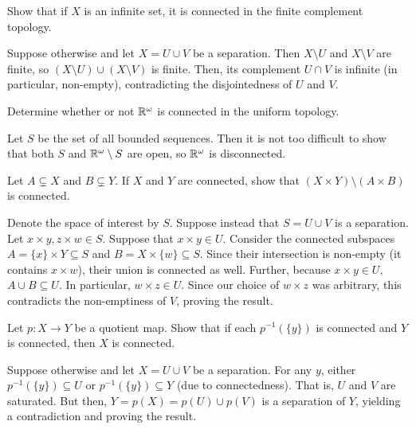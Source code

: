 	\begin{exercise}
		Show that if $X$ is an infinite set, it is connected in the finite complement topology.
	\end{exercise}
	\begin{solution*}
		Suppose otherwise and let $X=U\cup V$ be a separation. Then $X\setminus U$ and $X\setminus V$ are finite, so $(X\setminus U)\cup (X\setminus V)$ is finite. Then, its complement $U\cap V$ is infinite (in particular, non-empty), contradicting the disjointedness of $U$ and $V$. 
	\end{solution*}

	\setcounter{exercise}{7}
	\begin{exercise}
		Determine whether or not $\mathbb{R}^\omega$ is connected in the uniform topology.
	\end{exercise}
	\begin{solution*}
		Let $S$ be the set of all bounded sequences. Then it is not too difficult to show that both $S$ and $\mathbb{R}^\omega\setminus S$ are open, so $\mathbb{R}^\omega$ is disconnected.
	\end{solution*}


	\begin{exercise}
		Let $A\subsetneq X$ and $B\subsetneq Y$. If $X$ and $Y$ are connected, show that $(X\times Y)\setminus(A\times B)$ is connected.
	\end{exercise}
	\begin{solution*}
		Denote the space of interest by $S$. Suppose instead that $S = U\cup V$ is a separation. Let $x\times y, z\times w\in S$. Suppose that $x\times y\in U$. Consider the connected subspaces $A = \{x\}\times Y \subseteq S$ and $B = X\times \{w\}\subseteq S$. Since their intersection is non-empty (it contains $x\times w$), their union is connected as well. Further, because $x\times y\in U$, $A\cup B\subseteq U$. In particular, $w\times z \in U$. Since our choice of $w\times z$ was arbitrary, this contradicts the non-emptiness of $V$, proving the result.
	\end{solution*}

	\setcounter{exercise}{10}
	\begin{exercise}
		Let $p:X\to Y$ be a quotient map. Show that if each $p^{-1}(\{y\})$ is connected and $Y$ is connected, then $X$ is connected.
	\end{exercise}
	\begin{solution*}
		Suppose otherwise and let $X=U\cup V$ be a separation. For any $y$, either $p^{-1}(\{y\})\subseteq U$ or $p^{-1}(\{y\})\subseteq Y$ (due to connectedness). That is, $U$ and $V$ are saturated. But then, $Y = p(X) = p(U) \cup p(V)$ is a separation of $Y$, yielding a contradiction and proving the result.
	\end{solution*}

